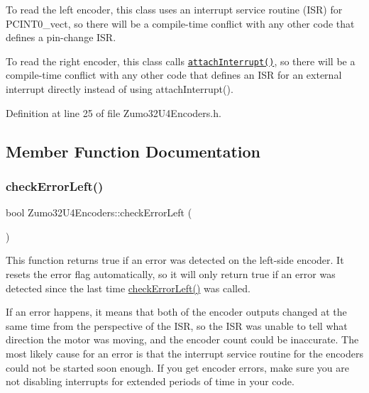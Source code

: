 To read the left encoder, this class uses an interrupt service routine (I\+SR) for P\+C\+I\+N\+T0\+\_\+vect, so there will be a compile-\/time conflict with any other code that defines a pin-\/change I\+SR.

To read the right encoder, this class calls \href{http://arduino.cc/en/Reference/attachInterrupt}{\tt attach\+Interrupt()}, so there will be a compile-\/time conflict with any other code that defines an I\+SR for an external interrupt directly instead of using attach\+Interrupt(). 

Definition at line 25 of file Zumo32\+U4\+Encoders.\+h.



\subsection{Member Function Documentation}
\mbox{\label{class_zumo32_u4_encoders_ad20765947ef87f562a4a19975a7fb9ca}} 
\subsubsection{\texorpdfstring{check\+Error\+Left()}{checkErrorLeft()}}
{\footnotesize\ttfamily bool Zumo32\+U4\+Encoders\+::check\+Error\+Left (\begin{DoxyParamCaption}{ }\end{DoxyParamCaption})\hspace{0.3cm}{\ttfamily [static]}}

This function returns true if an error was detected on the left-\/side encoder. It resets the error flag automatically, so it will only return true if an error was detected since the last time \hyperlink{class_zumo32_u4_encoders_ad20765947ef87f562a4a19975a7fb9ca}{check\+Error\+Left()} was called.

If an error happens, it means that both of the encoder outputs changed at the same time from the perspective of the I\+SR, so the I\+SR was unable to tell what direction the motor was moving, and the encoder count could be inaccurate. The most likely cause for an error is that the interrupt service routine for the encoders could not be started soon enough. If you get encoder errors, make sure you are not disabling interrupts for extended periods of time in your code. 


